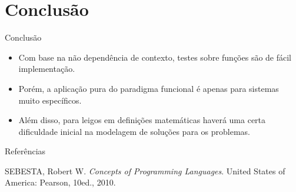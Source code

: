 \documentclass[12pt]{beamer} %
\begin{document}
\section{Conclusão}

\begin{frame}{Conclusão}
	\begin{itemize}
	\setlength\itemsep{1.5em}
		\item Com base na não dependência de contexto, testes sobre funções são de fácil implementação.

		\item Porém, a aplicação pura do paradigma funcional é apenas para sistemas muito específicos.

		\item Além disso, para leigos em definições matemáticas haverá uma certa dificuldade inicial na modelagem de soluções para os problemas.
	\end{itemize}
\end{frame}



\begin{frame}{Referências}
	\begin{thebibliography}{9}

			SEBESTA, Robert W. \textit{Concepts of Programming Languages}. United States of America: Pearson, 10ed., 2010.

	\end{thebibliography}
\end{frame}
\end{document}
